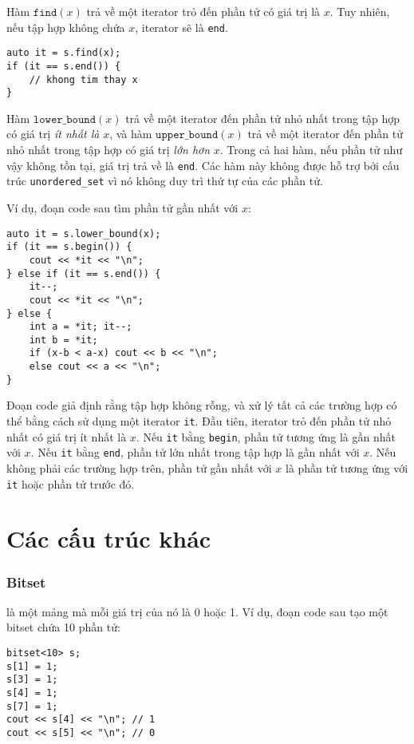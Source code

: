 Hàm $\texttt{find}(x)$ trả về một iterator
trỏ đến phần tử có giá trị là $x$.
Tuy nhiên, nếu tập hợp không chứa $x$,
iterator sẽ là \texttt{end}.

\begin{lstlisting}
auto it = s.find(x);
if (it == s.end()) {
    // khong tim thay x
}
\end{lstlisting}

Hàm $\texttt{lower\_bound}(x)$ trả về
một iterator đến phần tử nhỏ nhất trong tập hợp
có giá trị \emph{ít nhất là} $x$, và
hàm $\texttt{upper\_bound}(x)$
trả về một iterator đến phần tử nhỏ nhất trong tập hợp
có giá trị \emph{lớn hơn} $x$.
Trong cả hai hàm, nếu phần tử như vậy không tồn tại,
giá trị trả về là \texttt{end}.
Các hàm này không được hỗ trợ bởi cấu trúc
\texttt{unordered\_set} vì nó
không duy trì thứ tự của các phần tử.

\begin{samepage}
Ví dụ, đoạn code sau tìm phần tử
gần nhất với $x$:

\begin{lstlisting}
auto it = s.lower_bound(x);
if (it == s.begin()) {
    cout << *it << "\n";
} else if (it == s.end()) {
    it--;
    cout << *it << "\n";
} else {
    int a = *it; it--;
    int b = *it;
    if (x-b < a-x) cout << b << "\n";
    else cout << a << "\n";
}
\end{lstlisting}

Đoạn code giả định rằng tập hợp không rỗng,
và xử lý tất cả các trường hợp có thể
bằng cách sử dụng một iterator \texttt{it}.
Đầu tiên, iterator trỏ đến phần tử nhỏ nhất
có giá trị ít nhất là $x$.
Nếu \texttt{it} bằng \texttt{begin},
phần tử tương ứng là gần nhất với $x$.
Nếu \texttt{it} bằng \texttt{end},
phần tử lớn nhất trong tập hợp là gần nhất với $x$.
Nếu không phải các trường hợp trên,
phần tử gần nhất với $x$ là
phần tử tương ứng với \texttt{it} hoặc phần tử trước đó.
\end{samepage}

\section{Các cấu trúc khác}

\subsubsection{Bitset}


 là một mảng
mà mỗi giá trị của nó là 0 hoặc 1.
Ví dụ, đoạn code sau tạo
một bitset chứa 10 phần tử:
\begin{lstlisting}
bitset<10> s;
s[1] = 1;
s[3] = 1;
s[4] = 1;
s[7] = 1;
cout << s[4] << "\n"; // 1
cout << s[5] << "\n"; // 0
\end{lstlisting}

